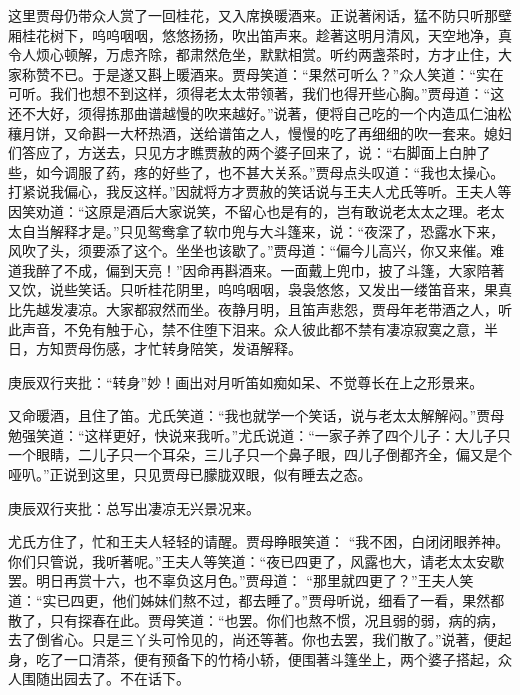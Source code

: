 \begin{parag}


    这里贾母仍带众人赏了一回桂花，又入席换暖酒来。正说著闲话，猛不防只听那壁厢桂花树下，呜呜咽咽，悠悠扬扬，吹出笛声来。趁著这明月清风，天空地净，真令人烦心顿解，万虑齐除，都肃然危坐，默默相赏。听约两盏茶时，方才止住，大家称赞不已。于是遂又斟上暖酒来。贾母笑道：“果然可听么？”众人笑道：“实在可听。我们也想不到这样，须得老太太带领著，我们也得开些心胸。”贾母道：“这还不大好，须得拣那曲谱越慢的吹来越好。”说著，便将自己吃的一个内造瓜仁油松穰月饼，又命斟一大杯热酒，送给谱笛之人，慢慢的吃了再细细的吹一套来。媳妇们答应了，方送去，只见方才瞧贾赦的两个婆子回来了，说：“右脚面上白肿了些，如今调服了药，疼的好些了，也不甚大关系。”贾母点头叹道：“我也太操心。打紧说我偏心，我反这样。”因就将方才贾赦的笑话说与王夫人尤氏等听。王夫人等因笑劝道：“这原是酒后大家说笑，不留心也是有的，岂有敢说老太太之理。老太太自当解释才是。”只见鸳鸯拿了软巾兜与大斗篷来，说：“夜深了，恐露水下来，风吹了头，须要添了这个。坐坐也该歇了。”贾母道：“偏今儿高兴，你又来催。难道我醉了不成，偏到天亮！”因命再斟酒来。一面戴上兜巾，披了斗篷，大家陪著又饮，说些笑话。只听桂花阴里，呜呜咽咽，袅袅悠悠，又发出一缕笛音来，果真比先越发凄凉。大家都寂然而坐。夜静月明，且笛声悲怨，贾母年老带酒之人，听此声音，不免有触于心，禁不住堕下泪来。众人彼此都不禁有凄凉寂寞之意，半日，方知贾母伤感，才忙转身陪笑，发语解释。\begin{note}庚辰双行夹批：“转身”妙！画出对月听笛如痴如呆、不觉尊长在上之形景来。\end{note}又命暖酒，且住了笛。尤氏笑道：“我也就学一个笑话，说与老太太解解闷。”贾母勉强笑道：“这样更好，快说来我听。”尤氏说道：“一家子养了四个儿子：大儿子只一个眼睛，二儿子只一个耳朵，三儿子只一个鼻子眼，四儿子倒都齐全，偏又是个哑叭。”正说到这里，只见贾母已朦胧双眼，似有睡去之态。\begin{note}庚辰双行夹批：总写出凄凉无兴景况来。\end{note}尤氏方住了，忙和王夫人轻轻的请醒。贾母睁眼笑道： “我不困，白闭闭眼养神。你们只管说，我听著呢。”王夫人等笑道：“夜已四更了，风露也大，请老太太安歇罢。明日再赏十六，也不辜负这月色。”贾母道： “那里就四更了？”王夫人笑道：“实已四更，他们姊妹们熬不过，都去睡了。”贾母听说，细看了一看，果然都散了，只有探春在此。贾母笑道：“也罢。你们也熬不惯，况且弱的弱，病的病，去了倒省心。只是三丫头可怜见的，尚还等著。你也去罢，我们散了。”说著，便起身，吃了一口清茶，便有预备下的竹椅小轿，便围著斗篷坐上，两个婆子搭起，众人围随出园去了。不在话下。
\end{parag}


